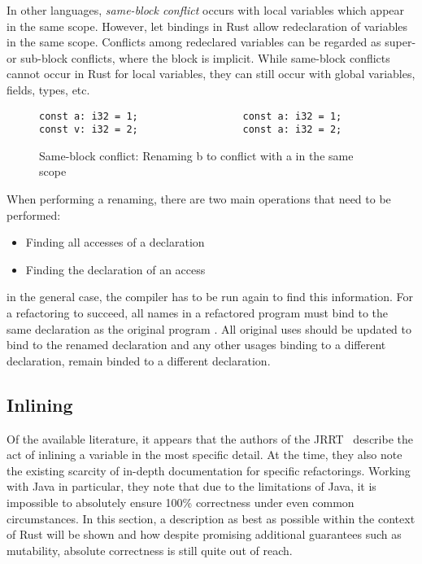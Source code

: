 In other languages, \textit{same-block conflict} occurs with local variables which appear in the same scope. However, let bindings in Rust allow redeclaration of variables in the same scope. Conflicts among redeclared variables can be regarded as super- or sub-block conflicts, where the block is implicit. While same-block conflicts cannot occur in Rust for local variables, they can still occur with global variables, fields, types, etc.

\begin{figure}[h]
\begin{verbatim}
const a: i32 = 1;                  const a: i32 = 1;
const v: i32 = 2;                  const a: i32 = 2;
\end{verbatim}
\caption{Same-block conflict: Renaming b to conflict with a in the same scope}
\label{Fig:same}
\end{figure}

When performing a renaming, there are two main operations that need to be performed:
\begin{itemize}
\item Finding all accesses of a declaration
\item Finding the declaration of an access
\end{itemize}

in the general case, the compiler has to be run again to find this information. For a refactoring to succeed, all names in a refactored program must bind to the same declaration as the original program \cite{schafer2010specification}. All original uses should be updated to bind to the renamed declaration and any other usages binding to a different declaration, remain binded to a different declaration.

\subsection{Inlining}

Of the available literature, it appears that the authors of the JRRT~\cite{schafer2010specification} describe the act of inlining a variable in the most specific detail. At the time, they also note the existing scarcity of in-depth documentation for specific refactorings. Working with Java in particular, they note that due to the limitations of Java, it is impossible to absolutely ensure 100\% correctness under even common circumstances. In this section, a description as best as possible within the context of Rust will be shown and how despite promising additional guarantees such as mutability, absolute correctness is still quite out of reach.

